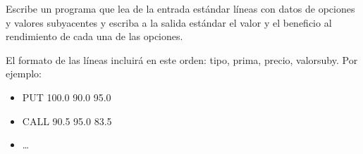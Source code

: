 \begin{enumerate}
\begin{itemize}
\begin{itemize}
  \end{itemize}

\end{itemize}

Escribe un programa que lea de la entrada estándar líneas con datos de opciones
y valores subyacentes y escriba a la salida estándar el valor y el beneficio al
rendimiento de cada una de las opciones.

El formato de las líneas incluirá en este orden: tipo, prima, precio, valorsuby.
Por ejemplo:

  \begin{itemize}

    \item PUT 100.0 90.0 95.0
    \item CALL 90.5 95.0 83.5
    \item \ldots

  \end{itemize}

\end{enumerate}
